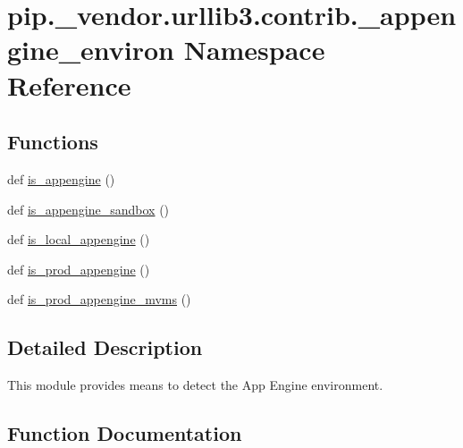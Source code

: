 \hypertarget{namespacepip_1_1__vendor_1_1urllib3_1_1contrib_1_1__appengine__environ}{}\section{pip.\+\_\+vendor.\+urllib3.\+contrib.\+\_\+appengine\+\_\+environ Namespace Reference}
\label{namespacepip_1_1__vendor_1_1urllib3_1_1contrib_1_1__appengine__environ}
\subsection*{Functions}
\begin{DoxyCompactItemize}
\item 
def \hyperlink{namespacepip_1_1__vendor_1_1urllib3_1_1contrib_1_1__appengine__environ_adb43bf4440d9f5c00ceff9186811095a}{is\+\_\+appengine} ()
\item 
def \hyperlink{namespacepip_1_1__vendor_1_1urllib3_1_1contrib_1_1__appengine__environ_a56a929028d5cbab08aa173f229b8b060}{is\+\_\+appengine\+\_\+sandbox} ()
\item 
def \hyperlink{namespacepip_1_1__vendor_1_1urllib3_1_1contrib_1_1__appengine__environ_a92b2b7f18632d050df38d42c56d7e2d9}{is\+\_\+local\+\_\+appengine} ()
\item 
def \hyperlink{namespacepip_1_1__vendor_1_1urllib3_1_1contrib_1_1__appengine__environ_a97659d50df94878bbbe9ae27a8a0dc55}{is\+\_\+prod\+\_\+appengine} ()
\item 
def \hyperlink{namespacepip_1_1__vendor_1_1urllib3_1_1contrib_1_1__appengine__environ_afcddb30d1ed32049958bce6302d15fcf}{is\+\_\+prod\+\_\+appengine\+\_\+mvms} ()
\end{DoxyCompactItemize}


\subsection{Detailed Description}
\begin{DoxyVerb}This module provides means to detect the App Engine environment.
\end{DoxyVerb}
 

\subsection{Function Documentation}
\mbox{\label{namespacepip_1_1__vendor_1_1urllib3_1_1contrib_1_1__appengine__environ_adb43bf4440d9f5c00ceff9186811095a}} 
